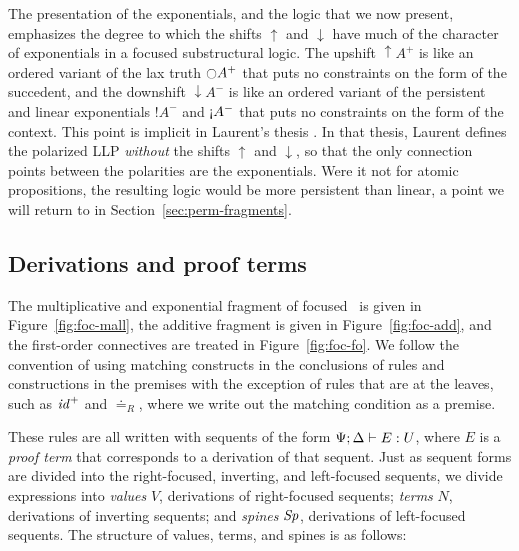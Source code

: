 The presentation of the exponentials, and the logic that we now
present, emphasizes the degree to which the shifts ${\uparrow}$ and
${\downarrow}$ have much of the character of exponentials in a focused
substructural logic. The upshift ${\uparrow}A^+$ is like an ordered
variant of the lax truth ${\ocircle}A^+$ that puts no constraints on
the form of the succedent, and the downshift ${\downarrow}A^-$ is
like an ordered variant of the persistent and linear exponentials
${!}A^-$ and ${\gnab}A^-$ that puts no constraints on the form of the
context. This point is implicit in Laurent's thesis
\cite{laurent02etude}. In that thesis, Laurent defines the polarized
LLP {\it without} the shifts ${\uparrow}$ and ${\downarrow}$, so that
the only connection points between the polarities are the
exponentials. Were it not for atomic propositions, the resulting logic
would be more persistent than linear,
a point we will return to in Section~\ref{sec:perm-fragments}.

\subsection{Derivations and proof terms}
\label{sec:ord-proof-terms}





The multiplicative and exponential fragment of focused \ollll~is given
in Figure~\ref{fig:foc-mall}, the additive fragment is given in
Figure~\ref{fig:foc-add}, and the first-order connectives are treated
in Figure~\ref{fig:foc-fo}. We follow the convention of using matching
constructs in the conclusions of rules and constructions in the premises
with the exception of rules that are at the leaves, such as 
${\it id}^+$ and ${\doteq}_R$, where we write out the matching
condition as a premise. 

These rules are all written with sequents
of the form ${\Psi}; {\Delta} \vdash {E} : {U}$, where $E$ is a {\it proof
  term} that corresponds to a derivation of that sequent. Just
as sequent forms are divided into the right-focused, inverting, and
left-focused sequents, we divide expressions into {\it values} $V$,
derivations of right-focused sequents; {\it terms} $N$,
derivations of inverting sequents; and {\it spines} ${\it Sp}$,
derivations of left-focused sequents. The structure of
values, terms, and spines is as follows:


